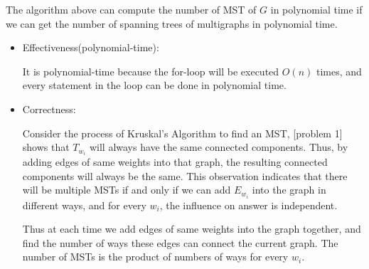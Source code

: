     The algorithm above can compute the number of MST of $G$ in polynomial time if we can get the number of spanning trees of multigraphs in polynomial time.
    \begin{itemize}
        \item Effectiveness(polynomial-time):

            It is polynomial-time because the for-loop will be executed $O(n)$ times, and every statement in the loop can be done in polynomial time.

        \item Correctness:

            Consider the process of Kruskal's Algorithm to find an MST, [problem 1] shows that $T_{w_i}$ will always have the same connected components. Thus, by adding edges of same weights into that graph, the resulting connected components will always be the same. This observation indicates that there will be multiple MSTs if and only if we can add $E_{w_i}$ into the graph in different ways, and for every $w_i$, the influence on answer is independent.

            Thus at each time we add edges of same weights into the graph together, and find the number of ways these edges can connect the current graph. The number of MSTs is the product of numbers of ways for every $w_i$.


    \end{itemize}
    

